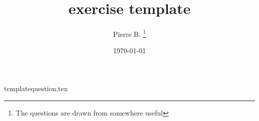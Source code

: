 \documentclass[10pt]{article}
\newcounter{question}
\begin{document}
 

\title{exercise template}
\author{Pierre B. \thanks{The questions are drawn from somewhere useful}}
\date{\today}
\maketitle

\newpage
{templatequestion.tex}
\end{document}
